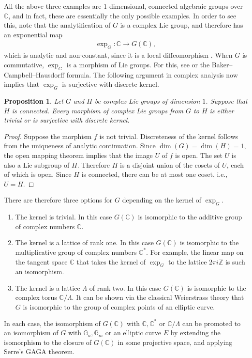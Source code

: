\documentclass[12pt, reqno]{amsart}
\newcommand{\G}{\mathbb{G}}
\newcommand{\C}{\mathbb{C}}
\newcommand{\Z}{\mathbb{Z}}
\newtheorem{proposition}[theorem]{Proposition}
\theoremstyle{remark}
\theoremstyle{definition}
\numberwithin{equation}{section}
\begin{document}
All the above three examples are $1$-dimensional, connected algebraic groups over $\mathbb{C}$, and in fact, these are essentially the only possible examples. In order to see this, note that the analytification of $G$ is a complex Lie group, and therefore has an exponential map
\begin{align*}
    \exp_G : \C \to G(\C),
\end{align*}
which is analytic and non-constant, since it is a local diffeomorphism \cite[Proposition 20.8 (f)]{Lee_introduction_to_smooth_manifolds}. When $G$ is commutative, $\exp_G$ is a morphism of Lie groups. For this, see \cite[Exercise 20-8]{Lee_introduction_to_smooth_manifolds} or the Baker--Campbell--Hausdorff formula. The following argument in complex analysis now implies that $\exp_G$ is surjective with discrete kernel.

\begin{proposition}
\label{structure_of_morphisms_of_1_dim_Lie_groups}
    Let $G$ and $H$ be complex Lie groups of dimension $1$. Suppose that $H$ is connected. Every morphism of complex Lie groups from $G$ to $H$ is either trivial or is surjective with discrete kernel.
\end{proposition}
\begin{proof}
    Suppose the morphism $f$ is not trivial. Discreteness of the kernel follows from the uniqueness of analytic continuation. Since $\dim(G) = \dim(H) = 1$, the open mapping theorem implies that the image $U$ of $f$ is open. The set $U$ is also a Lie subgroup of $H$. Therefore $H$ is a disjoint union of the cosets of $U$, each of which is open. Since $H$ is connected, there can be at most one coset, i.e., $U = H$. 
\end{proof}

There are therefore three options for $G$ depending on the kernel of $\exp_G$.
\begin{enumerate}[(1)]
    \item The kernel is trivial. In this case $G(\C)$ is isomorphic to the additive group of complex numbers $\C$.
    \item The kernel is a lattice of rank one. In this case $G(\C)$ is isomorphic to the multiplicative group of complex numbers $\C^\ast$. For example, the linear map on the tangent space $\C$ that takes the kernel of $\exp_G$ to the lattice $2\pi i \Z$ is such an isomorphism.
    \item The kernel is a lattice $\Lambda$ of rank two. In this case $G(\C)$ is isomorphic to the complex torus $\C/\Lambda$. It can be shown via the classical Weierstrass theory \cite[Proposition VI.3.6]{Silverman_the_arithmetic_of_elliptic_curves} that $G$ is isomorphic to the group of complex points of an elliptic curve.
\end{enumerate}
In each case, the isomorphism of $G(\C)$ with $\C, \C^\ast$ or $\C/\Lambda$ can be promoted to an isomorphism of $G$ with $\G_a, \G_m$ or an elliptic curve $E$ by extending the isomorphism to the closure of $G(\C)$ in some projective space, and applying Serre's GAGA theorem.
\end{document}
